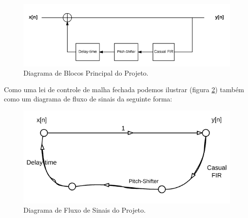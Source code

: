	\begin{figure}[!h t b]
		\label{bloco-principal}
		\centering
		\includegraphics[scale=0.5]{./figuras/diagrama_bloco_principal.PNG}
		\caption{Diagrama de Blocos Principal do Projeto.}
	\end{figure}

	Como uma lei de controle de malha fechada podemos ilustrar (figura \ref{signal_principal}) também como um diagrama de fluxo de sinais da seguinte forma:
	
	\begin{figure}[!h t b]
		\centering
		\includegraphics[scale=0.5]{./figuras/fluxo_de_sinais_principal.png}
		\caption{Diagrama de Fluxo de Sinais do Projeto.}	
		\label{signal_principal}
	\end{figure}
	
	
	
	
	
	

